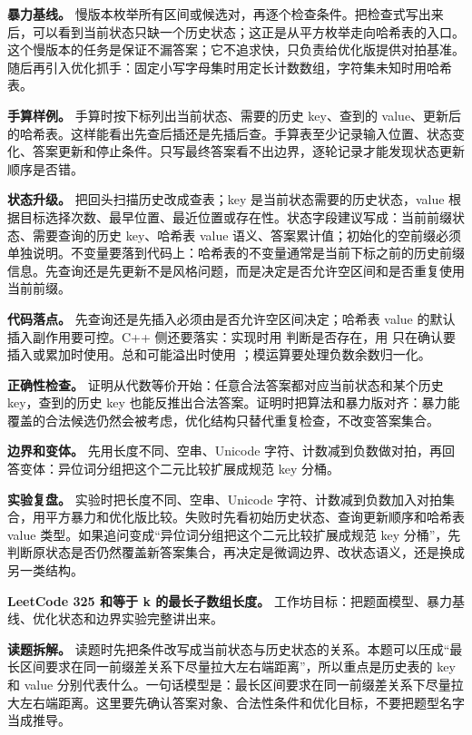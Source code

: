 \textbf{暴力基线。} 慢版本枚举所有区间或候选对，再逐个检查条件。把检查式写出来后，可以看到当前状态只缺一个历史状态；这正是从平方枚举走向哈希表的入口。这个慢版本的任务是保证不漏答案；它不追求快，只负责给优化版提供对拍基准。随后再引入优化抓手：固定小写字母集时用定长计数数组，字符集未知时用哈希表。

\textbf{手算样例。} 手算时按下标列出当前状态、需要的历史 key、查到的 value、更新后的哈希表。这样能看出先查后插还是先插后查。手算表至少记录输入位置、状态变化、答案更新和停止条件。只写最终答案看不出边界，逐轮记录才能发现状态更新顺序是否错。

\textbf{状态升级。} 把回头扫描历史改成查表；key 是当前状态需要的历史状态，value 根据目标选择次数、最早位置、最近位置或存在性。状态字段建议写成：当前前缀状态、需要查询的历史 key、哈希表 value 语义、答案累计值；初始化的空前缀必须单独说明。不变量要落到代码上：哈希表的不变量通常是当前下标之前的历史前缀信息。先查询还是先更新不是风格问题，而是决定是否允许空区间和是否重复使用当前前缀。

\textbf{代码落点。} 先查询还是先插入必须由是否允许空区间决定；哈希表 value 的默认插入副作用要可控。C++ 侧还要落实：实现时用  判断是否存在，用  只在确认要插入或累加时使用。总和可能溢出时使用 ；模运算要处理负数余数归一化。

\textbf{正确性检查。} 证明从代数等价开始：任意合法答案都对应当前状态和某个历史 key，查到的历史 key 也能反推出合法答案。证明时把算法和暴力版对齐：暴力能覆盖的合法候选仍然会被考虑，优化结构只替代重复检查，不改变答案集合。

\textbf{边界和变体。} 先用长度不同、空串、Unicode 字符、计数减到负数做对拍，再回答变体：异位词分组把这个二元比较扩展成规范 key 分桶。

\textbf{实验复盘。} 实验时把长度不同、空串、Unicode 字符、计数减到负数加入对拍集合，用平方暴力和优化版比较。失败时先看初始历史状态、查询更新顺序和哈希表 value 类型。如果追问变成“异位词分组把这个二元比较扩展成规范 key 分桶”，先判断原状态是否仍然覆盖新答案集合，再决定是微调边界、改状态语义，还是换成另一类结构。

\noindent\textbf{LeetCode 325 和等于 k 的最长子数组长度。} 工作坊目标：把题面模型、暴力基线、优化状态和边界实验完整讲出来。

\textbf{读题拆解。} 读题时先把条件改写成当前状态与历史状态的关系。本题可以压成“最长区间要求在同一前缀差关系下尽量拉大左右端距离”，所以重点是历史表的 key 和 value 分别代表什么。一句话模型是：最长区间要求在同一前缀差关系下尽量拉大左右端距离。这里要先确认答案对象、合法性条件和优化目标，不要把题型名字当成推导。

